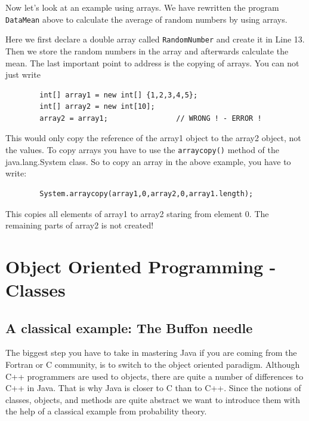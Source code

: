 Now let's look at an example using arrays. We have rewritten the program
\verb|DataMean| above to calculate the average of random 
numbers by using arrays.


Here we first declare a double array called \verb|RandomNumber| and
create it in Line 13. Then we store the random numbers in the array
and afterwards calculate the mean.
The last important point to address is the copying of arrays. 
You can not just write
\begin{verbatim}
        int[] array1 = new int[] {1,2,3,4,5};
        int[] array2 = new int[10];
        array2 = array1;                // WRONG ! - ERROR ! 
\end{verbatim}
This would only copy the reference of the array1 object to the array2
object, not the values. To copy arrays you have to use the 
\verb|arraycopy()| method of the java.lang.System class. 
So to copy an array in the above example, you have to write:
\begin{verbatim}
        System.arraycopy(array1,0,array2,0,array1.length);
\end{verbatim}
This copies all elements of array1 to array2 staring from element 0. 
The remaining parts 
of array2 is not created!


\section{Object Oriented Programming - Classes}
\label{sec:objectoriented}
\subsection{A classical example: The Buffon needle}
The biggest step you have to take in mastering Java if you are
coming from the Fortran or C community, is to switch to the object
oriented paradigm. Although C++ programmers are used to objects, there
are quite a number of differences to C++ in Java. That is why Java
is closer to C than to C++. Since the notions of classes, objects, and
methods are quite abstract we want to introduce them with the help of
a classical example from probability theory. 

